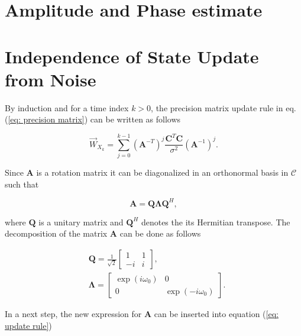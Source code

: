 \documentclass[11pt,a4paper,twoside]{report}
\newcommand{\messF}[3]{\vec{#1}_{{#2}_{k{#3}}}}
\newcommand{\mat}[1]{\mathbf{#1}}
\begin{document}
%

\chapter*{Amplitude and Phase estimate}



\chapter*{Independence of State Update from Noise}
By induction and for a time index $k>0$, the precision matrix update rule in eq. (\ref{eq: precision matrix}) can be written as follows

\begin{equation}
	\label{eq: update rule}
	\messF{W}{X}{} = \sum_{j=0}^{k-1}\left(\mat{A}^{-T}\right)^j\frac{\mat{C}^T\mat{C}}{\sigma^2}\left(\mat{A}^{-1}\right)^{j}.
\end{equation}

Since $\mat{A}$ is a rotation matrix it can be diagonalized in an orthonormal basis in $\mathcal{C}$ such that

\begin{equation}
	\mat{A} = \mat{Q\Lambda}\mat{Q}^H,
\end{equation}

where $\mat{Q}$ is a unitary matrix and $\mat{Q}^H$ denotes the its Hermitian transpose. The decomposition of the matrix $\mat{A}$ can be done as follows

\begin{align*}
	&\mat{Q} = \frac{1}{\sqrt{2}}
		\begin{bmatrix}
			1 & 1 \\
			-i & i
		\end{bmatrix},
	\\
	&\mat{\Lambda} = 
		\begin{bmatrix}
			\exp{(i\omega_0)} & 0 \\
			0 & \exp{(-i\omega_0)}
		\end{bmatrix}.
\end{align*}

In a next step, the new expression for $\mat{A}$ can be inserted into equation (\ref{eq: update rule}) \cite{ST:Malmberg}
\end{document}

